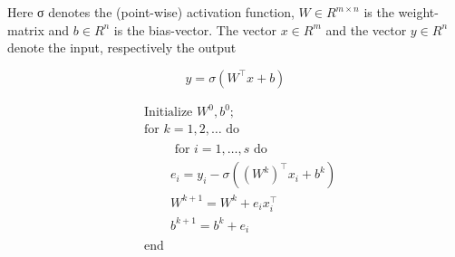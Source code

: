 Here σ denotes the (point-wise) activation function, $W \in R^{m\times n}$
is the weight-matrix and $b \in R^n$
is
the bias-vector. The vector $x \in R^m$ and the vector $y \in R^n$ denote the input, respectively the output


\begin{equation}
y=\sigma(W^\top x + b)
\end{equation}



\begin{align}
& \text { Initialize } W^0, b^0 \text {; } \\
& \text { for } k=1,2, \ldots \text { do } \\
& \qquad \begin{array}{|l}
\text { for } i=1, \ldots, s \text { do } \\
e_i=y_i-\sigma\left(\left(W^k\right)^{\top} x_i+b^k\right) \\
W^{k+1}=W^k+e_i x_i^{\top} \\
b^{k+1}=b^k+e_i
\end{array} \\
& \text { end }
\end{align}
